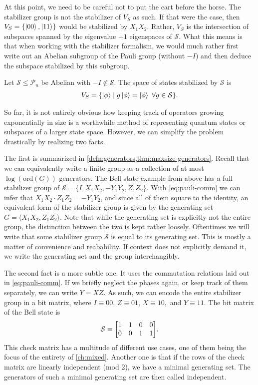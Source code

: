 At this point, we need to be careful not to put the cart before the horse. The stabilizer
group is not the stabilizer of $V_S$ as such. If that were the case, then $V_S
= \{ \ket{00}, \ket{11}\}$ would be stabilized by $X_1X_2$. Rather, $V_S$ is
the intersection of subspaces spanned by the eigenvalue $+1$ eigenspaces of 
$\mathcal{S}$. What this means is that when working with the stabilizer formalism, we would
much rather first write out an Abelian subgroup of the Pauli group (without
$-I$) and then
deduce the subspace stabilized by this subgroup. 

\begin{defn}\label{defn:stab-statespace}
  Let $\mathcal{S} \leq \mathcal{P}_n$ be Abelian with $-I \not\in
  \mathcal{S}$. The space of states stabilized by $\mathcal{S}$ is
  \begin{align}
    V_S = \{ \ket{\phi} \mid g\ket{\phi} = \ket{\phi} \ \forall g \in
    \mathcal{S} \}
  .\end{align}
\end{defn}

So far, it is not entirely obvious how keeping track of operators growing
exponentially in size is a worthwhile method of representing quantum states or
subspaces of a larger state space.
However, we can simplify the problem drastically by realizing two facts.

The first is summarized in \cref{defn:generators,thm:maxsize-generators}.
Recall that we can equivalently write a finite group as a collection of at most
$\log(\mathrm{ord}(G))$ generators. The Bell state example from above has a
full stabilizer group of $\mathcal{S} = \{I, X_1X_2, -Y_1Y_2, Z_1Z_2\}$. With
\cref{eq:pauli-comm} we can infer that $X_1X_2\cdot Z_1Z_2 = -Y_1Y_2$, and
since all of them square to the identity, an equivalent form of the stabilizer
group is given by the generating set $G = \langle X_1X_2, Z_1Z_2\rangle$.
Note that while the generating set is explicitly not the entire group, the
distinction between the two is kept rather loosely. Oftentimes we will write
that some stabilizer group $\mathcal{S}$ is equal to its generating set. This is mostly a matter of
convenience and reabability. If context does not explicitly demand it, we write
the generating set and the group interchangibly.

The second fact is a more subtle one. It uses the commutation relations
laid out in \cref{eq:pauli-comm}. If we briefly neglect the phases again, or keep
track of them separately, we can write $Y=XZ$. As such, we can encode the
entire stabilizer group in a bit matrix, where $I \equiv 00$, $Z \equiv 01$, $X
\equiv 10,$ and $Y \equiv 11$. The bit matrix of the Bell state is
\begin{align}
  \mathcal{S} \equiv \mqty[1 & 1 & 0 & 0 \\ 0 & 0 & 1 & 1]
.\end{align}
This check matrix has a multitude of different use cases, one of them being the
focus of the entirety of \cref{ch:mixed}.
Another one is that if the rows of the
check matrix are linearly independent (mod 2), we have a minimal generating
set. The generators of such a minimal generating set are then called
independent. 

